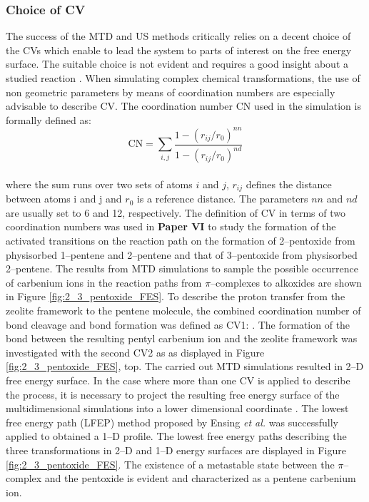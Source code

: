 \subsubsection*{Choice of CV}
The success of the MTD and US methods critically relies on a decent
choice of the CVs which enable to lead the
system to parts of interest on the free energy surface. The suitable choice is
not evident and requires a good insight about a studied
reaction \cite{Rohrdanz2013}. When simulating complex chemical transformations,
the use of non geometric parameters by means of coordination numbers are especially advisable to describe CV. The coordination number CN used in the simulation is formally
defined as: 
\[
\mathrm{CN} =\sum_{i,j}\frac{1-(r_{ij}/r_0 )^{nn}}{1-(r_{ij}/r_0 )^{nd}}
\] 
\\
where the sum runs over two sets of atoms ${i}$ and ${j}$, $r_{ij}$ defines the
distance between atoms i and j and $r_0$ is a reference distance. The parameters
$nn$ and $nd$ are usually set to 6 and 12, respectively. 
\npar
The definition of CV in terms of two coordination numbers was used in
\textbf{Paper VI} to study the formation of the activated transitions on the
reaction path on the formation of 2--pentoxide from physisorbed 1--pentene and
2--pentene and that of 3--pentoxide from physisorbed 2--pentene. The results
from MTD simulations to sample the possible occurrence of carbenium ions in the
reaction paths from $\pi$--complexes to alkoxides are shown in Figure
\ref{fig:2_3_pentoxide_FES}. To describe the proton transfer from the zeolite framework to the pentene molecule, the combined coordination number of
 bond cleavage and  bond formation was defined as CV1:
.
The formation of the  bond between the resulting pentyl carbenium ion
and the zeolite framework was investigated with the second CV2 as 
as displayed in Figure \ref{fig:2_3_pentoxide_FES}, top.
The carried out MTD simulations resulted in 2--D free energy surface. 
In the case where more than one CV is applied to describe the process, it is
necessary to project the resulting free energy surface of the multidimensional
simulations into a lower dimensional coordinate \cite{DeWispelaere2015}. The
lowest free energy path (LFEP) method proposed by Ensing \textit{et al.}
\cite{Ensing2005} was successfully applied to obtained a 1--D profile. The
lowest free energy paths describing the three transformations in 2--D and
1--D energy surfaces are displayed in Figure \ref{fig:2_3_pentoxide_FES}.
The existence of a metastable state between the $\pi$--complex and the pentoxide is evident and characterized as a pentene carbenium ion.

